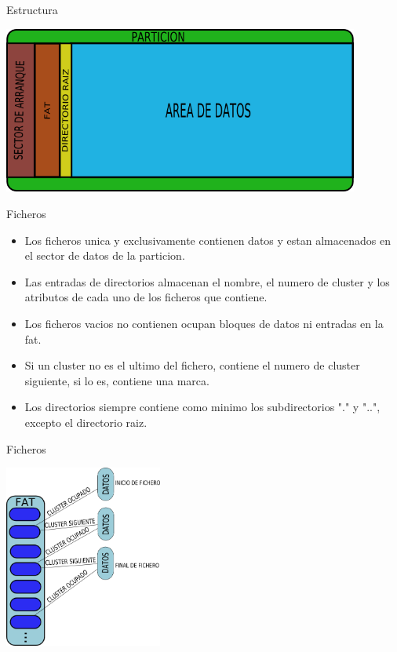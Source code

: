 \begin{frame}{Estructura}
  \begin{center}
    \includegraphics[height=5.5cm]{imgs/fat_struct.png}
  \end{center}
\end{frame}

\begin{frame}{Ficheros}
  \begin{itemize}
    \item Los ficheros unica y exclusivamente contienen datos y estan almacenados en el sector de datos de la particion.
    \item Las entradas de directorios almacenan el nombre, el numero de cluster y los atributos de cada uno de los ficheros que contiene.
    \item Los ficheros vacios no contienen ocupan bloques de datos ni entradas en la fat.
    \item Si un cluster no es el ultimo del fichero, contiene el numero de cluster siguiente, si lo es, contiene una marca.
    \item Los directorios siempre contiene como minimo los subdirectorios "." y "..", excepto el directorio raiz.
  \end{itemize}
\end{frame}

\begin{frame}{Ficheros}
  \begin{center}
    \includegraphics[height=6cm]{imgs/fat_files.png}
  \end{center}
\end{frame}
